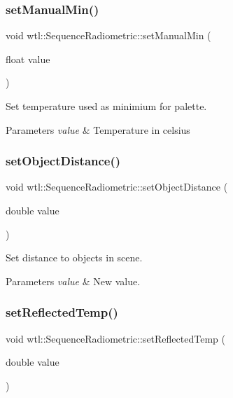 \subsubsection{\texorpdfstring{set\+Manual\+Min()}{setManualMin()}}
{\footnotesize\ttfamily void wtl\+::\+Sequence\+Radiometric\+::set\+Manual\+Min (\begin{DoxyParamCaption}\item[{float}]{value }\end{DoxyParamCaption})}



Set temperature used as minimium for palette. 


\begin{DoxyParams}{Parameters}
{\em value} & Temperature in celsius \\
\hline
\end{DoxyParams}
\mbox{\label{classwtl_1_1_sequence_radiometric_a4b9f85995050a4a683fdd0eed97bbee4}} 
\subsubsection{\texorpdfstring{set\+Object\+Distance()}{setObjectDistance()}}
{\footnotesize\ttfamily void wtl\+::\+Sequence\+Radiometric\+::set\+Object\+Distance (\begin{DoxyParamCaption}\item[{double}]{value }\end{DoxyParamCaption})}



Set distance to objects in scene. 


\begin{DoxyParams}{Parameters}
{\em value} & New value. \\
\hline
\end{DoxyParams}
\mbox{\label{classwtl_1_1_sequence_radiometric_aead15ea790587175b1db26a0859cc51d}} 
\subsubsection{\texorpdfstring{set\+Reflected\+Temp()}{setReflectedTemp()}}
{\footnotesize\ttfamily void wtl\+::\+Sequence\+Radiometric\+::set\+Reflected\+Temp (\begin{DoxyParamCaption}\item[{double}]{value }\end{DoxyParamCaption})}



